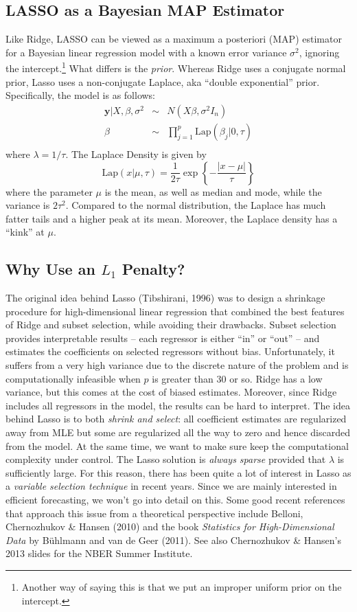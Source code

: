 \documentclass[12pt]{article}
\theoremstyle{definition}
\begin{document}
\subsection{LASSO as a Bayesian MAP Estimator}
Like Ridge, LASSO can be viewed as a maximum a posteriori (MAP) estimator for a Bayesian linear regression model with a known error variance $\sigma^2$, ignoring the intercept.\footnote{Another way of saying this is that we put an improper uniform prior on the intercept.} What differs is the \emph{prior}. Whereas Ridge uses a conjugate normal prior, Lasso uses a non-conjugate Laplace, aka ``double exponential'' prior. Specifically, the model is as follows:
	\begin{eqnarray*}
		\mathbf{y}|X,\beta, \sigma^2 &\sim& N(X\beta,\sigma^2 I_n)\\
		\beta&\sim& \prod_{j=1}^p \mbox{Lap}(\beta_j|0, \tau)\\
	\end{eqnarray*}
where $\lambda = 1/\tau$. The Laplace Density is given by
	$$\mbox{Lap}(x|\mu,\tau)= \frac{1}{2\tau}\exp\left
	\{-\frac{|x-\mu|}{\tau} \right\}$$
where the parameter $\mu$ is the mean, as well as median and mode, while the variance is $2\tau^2$. Compared to the normal distribution, the Laplace has much fatter tails and a higher peak at its mean. Moreover, the Laplace density has a ``kink'' at $\mu$.


\subsection{Why Use an $L_1$ Penalty?}
The original idea behind Lasso (Tibshirani, 1996) was to design a shrinkage procedure for high-dimensional linear regression that combined the best features of Ridge and subset selection, while avoiding their drawbacks. Subset selection provides interpretable results -- each regressor is either ``in'' or ``out'' -- and estimates the coefficients on selected regressors without bias. Unfortunately, it suffers from a very high variance due to the discrete nature of the problem and is computationally infeasible when $p$ is greater than 30 or so. Ridge has a low variance, but this comes at the cost of biased estimates. Moreover, since Ridge includes all regressors in the model, the results can be hard to interpret. The idea behind Lasso is to both \emph{shrink and select}: all coefficient estimates are regularized away from MLE but some are regularized all the way to zero and hence discarded from the model. At the same time, we want to make sure keep the computational complexity under control. The Lasso solution is \emph{always sparse} provided that $\lambda$ is sufficiently large. For this reason, there has been quite a lot of interest in Lasso as a \emph{variable selection technique} in recent years. Since we are mainly interested in efficient forecasting, we won't go into detail on this. Some good recent references that approach this issue from a theoretical perspective include Belloni, Chernozhukov \& Hansen (2010) and the book \emph{Statistics for High-Dimensional Data} by B\"{u}hlmann and van de Geer (2011). See also Chernozhukov \& Hansen's 2013 slides for the NBER Summer Institute. 
\end{document}
